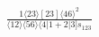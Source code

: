 \documentclass[varwidth, border=5pt]{standalone}
\begin{document}
\begin{my}
$\begin{gathered}
\scriptscriptstyle\frac{1⟨23⟩[23]⟨46⟩^2}{⟨12⟩⟨56⟩⟨4|1+2|3]s_{123}}
\end{gathered}$
\end{my}
\end{document}
